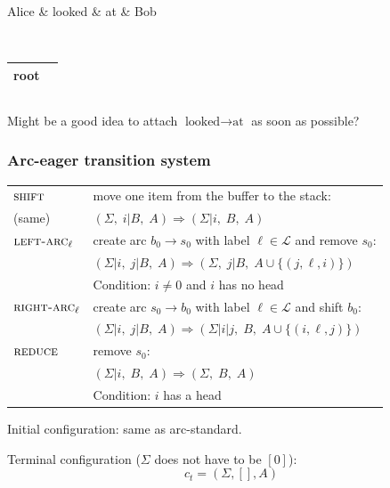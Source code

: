 \documentclass[t]{beamer}
\begin{document}
\begin{frame}
{\begin{varwidth}{2.2\linewidth}
{\begin{dependency}
\begin{deptext}[column sep=.7cm]
	Alice \& looked \& at \& Bob \\
	\end{deptext}
	\end{dependency}
	\\
	\begin{tabular}{|l|l|}\hline
	\color{red} root \\ \hline
	\end{tabular}
	\hspace{40mm}
	\begin{tabular}{|l|}\hline
	\quad \\ \hline
	\end{tabular}
	}
    \end{varwidth}
	}
	
	\pause\vfill
	Might be a good idea to attach $\textrm{looked} \to \textrm{at}$ as soon as possible?
\end{frame}


\begin{frame}
  \frametitle{Arc-eager transition system \cite{nivre2004incrementality}}
  \begin{tabular}{ll}
    $\textsc{shift}$ & move one item from the buffer to the stack: \\
    (same) & $(\Sigma, \; i | B, \; A) \Rightarrow (\Sigma | i, \; B, \; A)$ \\
    \hline
    $\textsc{left-arc}_\ell$ & create arc $b_0 \to s_0$ with label $\ell \in \mathcal{L}$ and remove $s_0$: \\
    & $(\Sigma | i, \; j | B, \; A) \Rightarrow (\Sigma, \; j | B, \; A \cup \{(j,\ell,i)\})$ \\
    & Condition: $i\neq0$ and $i$ has no head \\
    \hline
    $\textsc{right-arc}_\ell$ & create arc $s_0 \to b_0$ with label $\ell \in \mathcal{L}$ and shift $b_0$: \\
    & $(\Sigma | i, \; j | B, \; A) \Rightarrow (\Sigma | i|j, \; B, \; A \cup \{(i,\ell,j)\})$   \\
    \hline
    $\textsc{reduce}$ & remove $s_0$: \\
    & $(\Sigma | i, \; B, \; A) \Rightarrow (\Sigma, \; B, \; A)$ \\
    & Condition: $i$ has a head
  \end{tabular}
  
  \pause\vfill

  Initial configuration: same as arc-standard.

  Terminal configuration ($\Sigma$ does not have to be $[0]$):
  \[
    c_t = (\Sigma, [], A)
  \]
\end{frame}
\end{document}
